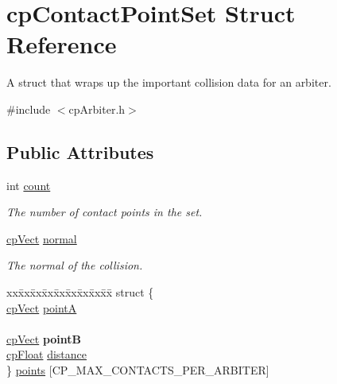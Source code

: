 \hypertarget{structcp_contact_point_set}{}\section{cp\+Contact\+Point\+Set Struct Reference}
\label{structcp_contact_point_set}


A struct that wraps up the important collision data for an arbiter.  




{\ttfamily \#include $<$cp\+Arbiter.\+h$>$}

\subsection*{Public Attributes}
\begin{DoxyCompactItemize}
\item 
\mbox{\label{structcp_contact_point_set_a06dadd34b06a8c7f00def95ca6a1ff88}} 
int \mbox{\hyperlink{structcp_contact_point_set_a06dadd34b06a8c7f00def95ca6a1ff88}{count}}
\begin{DoxyCompactList}\small\item\em The number of contact points in the set. \end{DoxyCompactList}\item 
\mbox{\label{structcp_contact_point_set_a2fab2c7e343e14833185b2c97e9fd5b8}} 
\mbox{\hyperlink{structcp_vect}{cp\+Vect}} \mbox{\hyperlink{structcp_contact_point_set_a2fab2c7e343e14833185b2c97e9fd5b8}{normal}}
\begin{DoxyCompactList}\small\item\em The normal of the collision. \end{DoxyCompactList}\item 
\mbox{\label{structcp_contact_point_set_a8130da87913d840ba93b9865f469872d}} 
\begin{tabbing}
xx\=xx\=xx\=xx\=xx\=xx\=xx\=xx\=xx\=\kill
struct \{\\
\>\mbox{\hyperlink{structcp_vect}{cpVect}} \mbox{\hyperlink{structcp_contact_point_set_a9d7ac05d747afa63699e89ea6dba62c2}{pointA}}\\
\>\\
\>\mbox{\hyperlink{structcp_vect}{cpVect}} {\bfseries pointB}\\
\>\mbox{\hyperlink{group__basic_types_gac1ed65573e035bf892505768c852d8d3}{cpFloat}} \mbox{\hyperlink{structcp_contact_point_set_ad8581bff488e9f44ef899f75e044bc6c}{distance}}\\
\} \mbox{\hyperlink{structcp_contact_point_set_a8130da87913d840ba93b9865f469872d}{points}} \mbox{[}CP\_MAX\_CONTACTS\_PER\_ARBITER\mbox{]}\\


\end{tabbing}
\end{DoxyCompactItemize}
